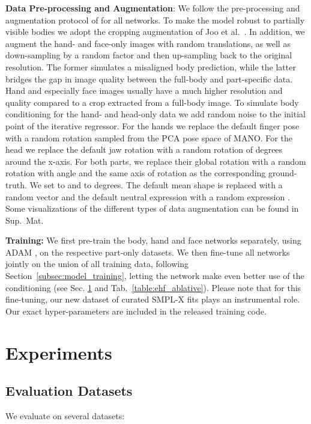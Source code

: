 \documentclass[runningheads]{llncs}
\newcommand{\smplx}{\mbox{SMPL-X}\xspace}
\newcommand{\groundtruth}{\mbox{ground-truth}\xspace}
\newcommand{\mano}{\mbox{MANO}\xspace}
\newcommand{\supmat}{Sup.~Mat.\xspace}
\newcommand{\etal}{et al.\xspace}
\begin{document}
\textbf{Data Pre-processing and Augmentation}:
We follow the pre-processing and augmentation protocol of \cite{Kolotouros_2019_ICCV} for all networks.
To make the model robust to partially visible bodies we adopt the cropping augmentation of Joo \etal~\cite{joo2020exemplar}.
In addition, we augment the hand- and face-only images with random translations, as well as down-sampling by a random factor and then up-sampling back to the original resolution.
The former simulates a misaligned body prediction, while the latter bridges the gap in image quality between the full-body and part-specific data.
Hand and especially face images usually have a much higher resolution and quality compared to a crop extracted from a full-body image.
To simulate body conditioning for the hand- and head-only data we add random noise to the initial point of the iterative regressor.
For the hands we replace the default finger pose with a random rotation  sampled from the PCA pose space of \mano. For the head  we replace the default jaw rotation  with a random rotation of  degrees around the x-axis. For both parts, we replace their global rotation with a random rotation with angle 
and the same axis of rotation as the corresponding \groundtruth.
We set
 to  and
 to  degrees.
The default mean shape is replaced with a random vector
 and the default neutral expression with a random expression .
Some visualizations of the different types of data augmentation can be found in \supmat

\textbf{Training:}
We first pre-train the body, hand and face networks separately, using ADAM
\cite{adam}, on the respective part-only datasets.
We then fine-tune all networks jointly on the union of all training data, following Section~\ref{subsec:model_training},
letting the network make even better use of the conditioning (see Sec. \ref{sec:experiments} and Tab.~\ref{table:ehf_ablative}).
Please note that for this fine-tuning, our new dataset of curated \smplx fits plays an instrumental role.
Our exact hyper-parameters are included in the released training code.

 


 \section{Experiments}
\label{sec:experiments}

\subsection{Evaluation Datasets}
\label{subsec:eval_datasets}
We evaluate on several datasets:
\end{document}
